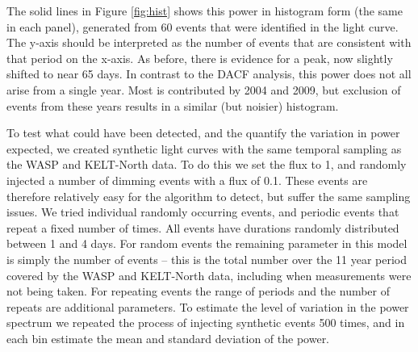 \documentclass[useAMS,usenatbib,usegraphicx]{mn2e}
\begin{document}


The solid lines in Figure \ref{fig:hist} shows this power in histogram form (the same in
each panel), generated from 60 events that were identified in the light curve. The y-axis
should be interpreted as the number of events that are consistent with that period on the
x-axis. As before, there is evidence for a peak, now slightly shifted to near 65 days. In
contrast to the DACF analysis, this power does not all arise from a single year. Most is
contributed by 2004 and 2009, but exclusion of events from these years results in a
similar (but noisier) histogram.

To test what could have been detected, and the quantify the variation in power expected,
we created synthetic light curves with the same temporal sampling as the WASP and
KELT-North data. To do this we set the flux to 1, and randomly injected a number of
dimming events with a flux of 0.1. These events are therefore relatively easy for the
algorithm to detect, but suffer the same sampling issues. We tried individual randomly
occurring events, and periodic events that repeat a fixed number of times. All events
have durations randomly distributed between 1 and 4 days. For random events the remaining
parameter in this model is simply the number of events -- this is the total number over
the 11 year period covered by the WASP and KELT-North data, including when measurements
were not being taken. For repeating events the range of periods and the number of repeats
are additional parameters. To estimate the level of variation in the power spectrum we
repeated the process of injecting synthetic events 500 times, and in each bin estimate
the mean and standard deviation of the power.
\end{document}

